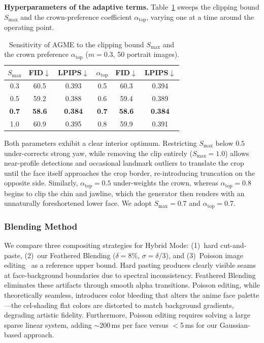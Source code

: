 \documentclass[journal]{IEEEtran}
\begin{document}
\textbf{Hyperparameters of the adaptive terms.} Table~\ref{tab:agme_hyper} sweeps the clipping bound $S_{\max}$ and the crown-preference coefficient $\alpha_{\text{top}}$, varying one at a time around the operating point.

\begin{table}[t]
\caption{Sensitivity of AGME to the clipping bound $S_{\max}$ and the crown preference $\alpha_{\text{top}}$ ($m = 0.3$, 50 portrait images).}
\label{tab:agme_hyper}
\centering
\begin{tabular}{ccc@{\hskip 1.2em}ccc}
\toprule
$S_{\max}$ & \textbf{FID}$\downarrow$ & \textbf{LPIPS}$\downarrow$ & $\alpha_{\text{top}}$ & \textbf{FID}$\downarrow$ & \textbf{LPIPS}$\downarrow$ \\
\midrule
0.3 & 60.5 & 0.393 & 0.5 & 60.3 & 0.394 \\
0.5 & 59.2 & 0.388 & 0.6 & 59.4 & 0.389 \\
\textbf{0.7} & \textbf{58.6} & \textbf{0.384} & \textbf{0.7} & \textbf{58.6} & \textbf{0.384} \\
1.0 & 60.9 & 0.395 & 0.8 & 59.9 & 0.391 \\
\bottomrule
\end{tabular}
\end{table}

Both parameters exhibit a clear interior optimum. Restricting $S_{\max}$ below $0.5$ under-corrects strong yaw, while removing the clip entirely ($S_{\max} = 1.0$) allows near-profile detections and occasional landmark outliers to translate the crop until the face itself approaches the crop border, re-introducing truncation on the opposite side. Similarly, $\alpha_{\text{top}} = 0.5$ under-weights the crown, whereas $\alpha_{\text{top}} = 0.8$ begins to clip the chin and jawline, which the generator then renders with an unnaturally foreshortened lower face. We adopt $S_{\max} = 0.7$ and $\alpha_{\text{top}} = 0.7$.

\subsubsection{Blending Method}
\label{subsec:ablation_blend}

We compare three compositing strategies for Hybrid Mode: (1)~hard cut-and-paste, (2)~our Feathered Blending ($\delta = 8\%$, $\sigma = \delta/3$), and (3)~Poisson image editing~\cite{Perez2003Poisson} as a reference upper bound. Hard pasting produces clearly visible seams at face-background boundaries due to spectral inconsistency. Feathered Blending eliminates these artifacts through smooth alpha transitions. Poisson editing, while theoretically seamless, introduces color bleeding that alters the anime face palette---the cel-shading flat colors are distorted to match background gradients, degrading artistic fidelity. Furthermore, Poisson editing requires solving a large sparse linear system, adding $\sim$200\,ms per face versus $<$5\,ms for our Gaussian-based approach.
\end{document}
